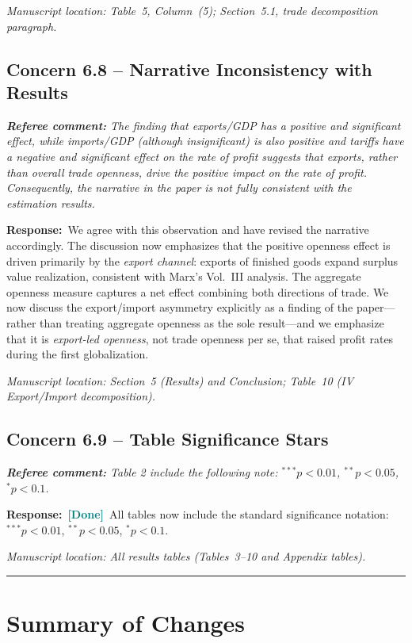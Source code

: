 \documentclass[11pt]{article}
\newcommand{\RC}[1]{\begin{refereebox}\textit{\textbf{Referee comment:} #1}\end{refereebox}}
\newcommand{\AR}{\noindent\textbf{Response:}\ }
\newcommand{\done}{\textcolor{teal}{\textbf{[Done]}}}
\begin{document}
\smallskip\noindent\textit{Manuscript location: Table~5, Column~(5); Section~5.1, trade decomposition paragraph.}

\subsection*{Concern 6.8 -- Narrative Inconsistency with Results}

\RC{The finding that exports/GDP has a positive and significant effect, while imports/GDP (although insignificant) is also positive and tariffs have a negative and significant effect on the rate of profit suggests that exports, rather than overall trade openness, drive the positive impact on the rate of profit. Consequently, the narrative in the paper is not fully consistent with the estimation results.}

\AR We agree with this observation and have revised the narrative accordingly. The discussion now emphasizes that the positive openness effect is driven primarily by the \emph{export channel}: exports of finished goods expand surplus value realization, consistent with Marx's Vol.~III analysis. The aggregate openness measure captures a net effect combining both directions of trade. We now discuss the export/import asymmetry explicitly as a finding of the paper---rather than treating aggregate openness as the sole result---and we emphasize that it is \emph{export-led openness}, not trade openness per se, that raised profit rates during the first globalization.

\smallskip\noindent\textit{Manuscript location: Section~5 (Results) and Conclusion; Table~10 (IV Export/Import decomposition).}

\subsection*{Concern 6.9 -- Table Significance Stars}

\RC{Table 2 include the following note: $^{***}p < 0.01$, $^{**}p < 0.05$, $^{*}p < 0.1$.}

\AR \done\ All tables now include the standard significance notation: $^{***}p<0.01$, $^{**}p<0.05$, $^{*}p<0.1$.

\smallskip\noindent\textit{Manuscript location: All results tables (Tables~3--10 and Appendix tables).}

\bigskip\noindent\rule{\textwidth}{0.4pt}\bigskip

\section*{Summary of Changes}
\end{document}
